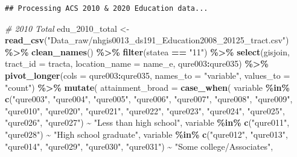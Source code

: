 \documentclass[
]{article}
\newenvironment{Shaded}{\begin{snugshade}}{\end{snugshade}}
\newcommand{\AttributeTok}[1]{\textcolor[rgb]{0.13,0.29,0.53}{#1}}
\newcommand{\CommentTok}[1]{\textcolor[rgb]{0.56,0.35,0.01}{\textit{#1}}}
\newcommand{\FunctionTok}[1]{\textcolor[rgb]{0.13,0.29,0.53}{\textbf{#1}}}
\newcommand{\NormalTok}[1]{#1}
\newcommand{\OtherTok}[1]{\textcolor[rgb]{0.56,0.35,0.01}{#1}}
\newcommand{\SpecialCharTok}[1]{\textcolor[rgb]{0.81,0.36,0.00}{\textbf{#1}}}
\newcommand{\StringTok}[1]{\textcolor[rgb]{0.31,0.60,0.02}{#1}}
\begin{document}
\begin{verbatim}
## Processing ACS 2010 & 2020 Education data...
\end{verbatim}

\begin{Shaded}
\begin{Highlighting}[]
\CommentTok{\# 2010 Total}
\NormalTok{edu\_2010\_total }\OtherTok{\textless{}{-}} \FunctionTok{read\_csv}\NormalTok{(}\StringTok{"Data\_raw/nhgis0013\_ds191\_Education2008\_20125\_tract.csv"}\NormalTok{) }\SpecialCharTok{\%\textgreater{}\%}
  \FunctionTok{clean\_names}\NormalTok{() }\SpecialCharTok{\%\textgreater{}\%} \FunctionTok{filter}\NormalTok{(statea }\SpecialCharTok{==} \StringTok{"11"}\NormalTok{) }\SpecialCharTok{\%\textgreater{}\%}
  \FunctionTok{select}\NormalTok{(gisjoin, }\AttributeTok{tract\_id =}\NormalTok{ tracta, }\AttributeTok{location\_name =}\NormalTok{ name\_e, qure003}\SpecialCharTok{:}\NormalTok{qure035) }\SpecialCharTok{\%\textgreater{}\%}
  \FunctionTok{pivot\_longer}\NormalTok{(}\AttributeTok{cols =}\NormalTok{ qure003}\SpecialCharTok{:}\NormalTok{qure035, }\AttributeTok{names\_to =} \StringTok{"variable"}\NormalTok{, }\AttributeTok{values\_to =} \StringTok{"count"}\NormalTok{) }\SpecialCharTok{\%\textgreater{}\%}
  \FunctionTok{mutate}\NormalTok{(}
    \AttributeTok{attainment\_broad =} \FunctionTok{case\_when}\NormalTok{(}
\NormalTok{      variable }\SpecialCharTok{\%in\%} \FunctionTok{c}\NormalTok{(}\StringTok{"qure003"}\NormalTok{, }\StringTok{"qure004"}\NormalTok{, }\StringTok{"qure005"}\NormalTok{, }\StringTok{"qure006"}\NormalTok{, }\StringTok{"qure007"}\NormalTok{, }\StringTok{"qure008"}\NormalTok{, }\StringTok{"qure009"}\NormalTok{, }\StringTok{"qure010"}\NormalTok{, }
                       \StringTok{"qure020"}\NormalTok{, }\StringTok{"qure021"}\NormalTok{, }\StringTok{"qure022"}\NormalTok{, }\StringTok{"qure023"}\NormalTok{, }\StringTok{"qure024"}\NormalTok{, }\StringTok{"qure025"}\NormalTok{, }\StringTok{"qure026"}\NormalTok{, }\StringTok{"qure027"}\NormalTok{) }\SpecialCharTok{\textasciitilde{}} \StringTok{"Less than high school"}\NormalTok{,}
\NormalTok{      variable }\SpecialCharTok{\%in\%} \FunctionTok{c}\NormalTok{(}\StringTok{"qure011"}\NormalTok{, }\StringTok{"qure028"}\NormalTok{) }\SpecialCharTok{\textasciitilde{}} \StringTok{"High school graduate"}\NormalTok{,}
\NormalTok{      variable }\SpecialCharTok{\%in\%} \FunctionTok{c}\NormalTok{(}\StringTok{"qure012"}\NormalTok{, }\StringTok{"qure013"}\NormalTok{, }\StringTok{"qure014"}\NormalTok{, }\StringTok{"qure029"}\NormalTok{, }\StringTok{"qure030"}\NormalTok{, }\StringTok{"qure031"}\NormalTok{) }\SpecialCharTok{\textasciitilde{}} \StringTok{"Some college/Associate\textquotesingle{}s"}\NormalTok{,}

\end{Highlighting}
\end{Shaded}
\end{document}
